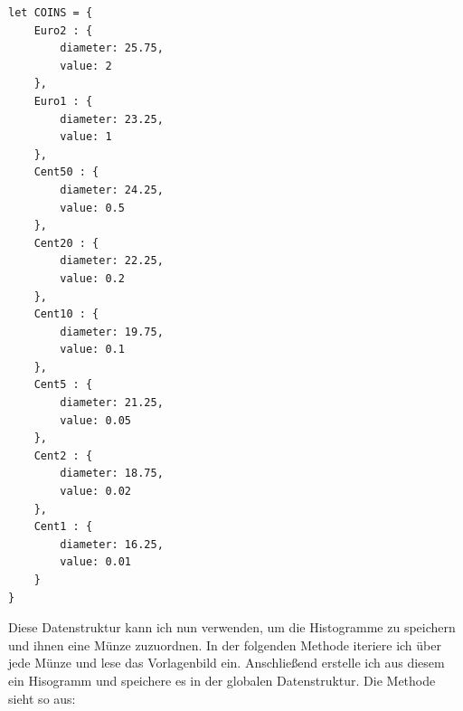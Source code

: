 \begin{lstlisting}[style=JavaScript]
let COINS = {
    Euro2 : {
        diameter: 25.75,
        value: 2
    },
    Euro1 : {
        diameter: 23.25,
        value: 1
    },
    Cent50 : {
        diameter: 24.25,
        value: 0.5
    },
    Cent20 : {
        diameter: 22.25,
        value: 0.2
    },
    Cent10 : {
        diameter: 19.75,
        value: 0.1
    },
    Cent5 : {
        diameter: 21.25,
        value: 0.05
    },
    Cent2 : {
        diameter: 18.75,
        value: 0.02
    },
    Cent1 : {
        diameter: 16.25,
        value: 0.01
    }
}    
\end{lstlisting}

Diese Datenstruktur kann ich nun verwenden, um die Histogramme zu speichern und ihnen eine Münze zuzuordnen. In der folgenden Methode iteriere ich über jede Münze und lese das Vorlagenbild ein. Anschließend erstelle ich aus diesem ein Hisogramm und speichere es in der globalen Datenstruktur. Die Methode sieht so aus:

